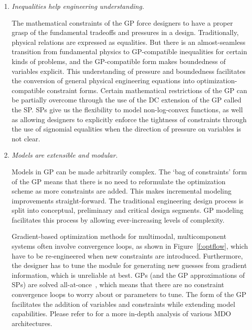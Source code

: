 \begin{enumerate}

    \item \textit{Inequalities help engineering understanding.}

    The mathematical constraints of the \gls{GP} force designers to have a proper grasp
    of the fundamental tradeoffs and pressures in a design.
    Traditionally, physical relations are expressed as equalities. But there is an
    almost-seamless transition from fundamental physics to GP-compatible
    inequalities for certain kinds of problems, and the \gls{GP}-compatible
    form makes boundedness of variables explicit. This understanding of pressure
    and boundedness facilitates the conversion of general physical engineering
    equations into optimization-compatible constraint forms.
    Certain mathematical restrictions of the \gls{GP} can be partially
    overcome through the use of the \gls{DC}
    extension of the \gls{GP} called the \gls{SP}. \gls{SP}s give us the flexibility to model
    non-log-convex functions, as well as allowing designers to explicitly enforce
    the tightness of
    constraints through the use of signomial equalities when the direction of pressure
    on variables is not clear.

    \item \textit{Models are extensible and modular.}

    Models in \gls{GP} can be made arbitrarily complex.
    The `bag of constraints' form of the \gls{GP}
    means that there is no need to reformulate the optimization scheme as more
    constraints are added. This makes incremental modeling improvements straight-forward.
    The traditional engineering design process is split into conceptual, preliminary
    and critical design segments. \gls{GP} modeling facilitates this process by allowing
    ever-increasing levels of complexity.

    Gradient-based optimization methods for
    multimodal, multicomponent systems often involve
    convergence loops, as shown in Figure~\ref{f:optflow}, which have to be re-engineered
    when new constraints are introduced. Furthermore, the designer has to tune
    the module for generating new guesses from gradient information, which is unreliable
    at best. \gls{GP}s (and the \gls{GP} approximations
    of \gls{SP}s) are solved all-at-once~\cite{martins_mdo}, which means that there are no constraint
    convergence loops to worry about or parameters to tune. The
    form of the GP facilitates the addition of variables and constraints while extending
    model capabilities. Please refer to \cite{martins_mdo}
    for a more in-depth analysis of various \gls{MDO} architectures.


\end{enumerate}
